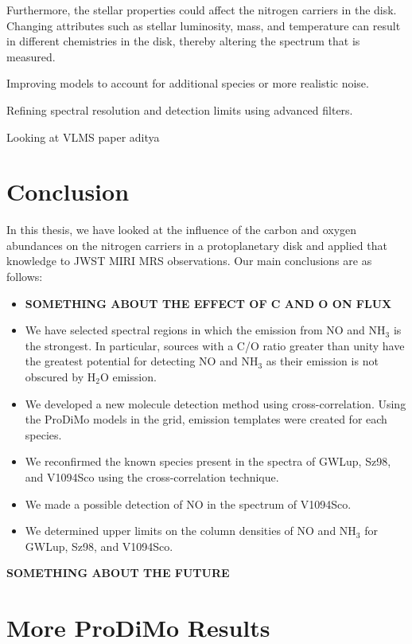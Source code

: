\documentclass[twoside, single, authoryear, semicolon, 12pt]{lion-msc}
\newcommand{\4}{$_4$}
\newcommand{\3}{$_3$}
\newcommand{\2}{$_2$}
\begin{document}
Furthermore, the stellar properties could affect the nitrogen carriers in the disk. Changing attributes such as stellar luminosity, mass, and temperature can result in different chemistries in the disk, thereby altering the spectrum that is measured. 

Improving models to account for additional species or more realistic noise.

Refining spectral resolution and detection limits using advanced filters.

Looking at VLMS paper aditya \citep{Arabhavi_2024}

\chapter{Conclusion}\label{Ch: Conclusion}
In this thesis, we have looked at the influence of the carbon and oxygen abundances on the nitrogen carriers in a protoplanetary disk and applied that knowledge to JWST MIRI MRS observations. Our main conclusions are as follows:
\begin{itemize}
    \item \textbf{SOMETHING ABOUT THE EFFECT OF C AND O ON FLUX}
    \item We have selected spectral regions in which the emission from NO and NH\3 is the strongest. In particular, sources with a C/O ratio greater than unity have the greatest potential for detecting NO and NH\3 as their emission is not obscured by H\2O emission.
    \item We developed a new molecule detection method using cross-correlation. Using the ProDiMo models in the grid, emission templates were created for each species. 
    \item We reconfirmed the known species present in the spectra of GWLup, Sz98, and V1094Sco using the cross-correlation technique.
    \item We made a possible detection of NO in the spectrum of V1094Sco.
    \item We determined upper limits on the column densities of NO and NH\3 for GWLup, Sz98, and V1094Sco.
\end{itemize}
\textbf{SOMETHING ABOUT THE FUTURE}


\appendix
\chapter{More ProDiMo Results}
\end{document}
